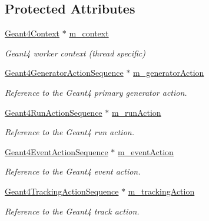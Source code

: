 \subsection*{Protected Attributes}
\begin{DoxyCompactItemize}
\item 
\hyperlink{class_d_d4hep_1_1_simulation_1_1_geant4_context}{Geant4\+Context} $\ast$ \hyperlink{class_d_d4hep_1_1_simulation_1_1_geant4_action_container_a72ed1f7c3f20c13479de89ebdfd10e77}{m\+\_\+context}
\begin{DoxyCompactList}\small\item\em Geant4 worker context (thread specific) \end{DoxyCompactList}\item 
\hyperlink{class_d_d4hep_1_1_simulation_1_1_geant4_generator_action_sequence}{Geant4\+Generator\+Action\+Sequence} $\ast$ \hyperlink{class_d_d4hep_1_1_simulation_1_1_geant4_action_container_acbb02aa950b5dc79ca78448a5ff23994}{m\+\_\+generator\+Action}
\begin{DoxyCompactList}\small\item\em Reference to the Geant4 primary generator action. \end{DoxyCompactList}\item 
\hyperlink{class_d_d4hep_1_1_simulation_1_1_geant4_run_action_sequence}{Geant4\+Run\+Action\+Sequence} $\ast$ \hyperlink{class_d_d4hep_1_1_simulation_1_1_geant4_action_container_a627339c1dc5e85a432170b010abd3505}{m\+\_\+run\+Action}
\begin{DoxyCompactList}\small\item\em Reference to the Geant4 run action. \end{DoxyCompactList}\item 
\hyperlink{class_d_d4hep_1_1_simulation_1_1_geant4_event_action_sequence}{Geant4\+Event\+Action\+Sequence} $\ast$ \hyperlink{class_d_d4hep_1_1_simulation_1_1_geant4_action_container_aa97d07df82c52404b5211277bca15a40}{m\+\_\+event\+Action}
\begin{DoxyCompactList}\small\item\em Reference to the Geant4 event action. \end{DoxyCompactList}\item 
\hyperlink{class_d_d4hep_1_1_simulation_1_1_geant4_tracking_action_sequence}{Geant4\+Tracking\+Action\+Sequence} $\ast$ \hyperlink{class_d_d4hep_1_1_simulation_1_1_geant4_action_container_a5a39104d6cb2d3d0c578ddb50fbb988b}{m\+\_\+tracking\+Action}
\begin{DoxyCompactList}\small\item\em Reference to the Geant4 track action. \end{DoxyCompactList}\item 

\end{DoxyCompactItemize}
